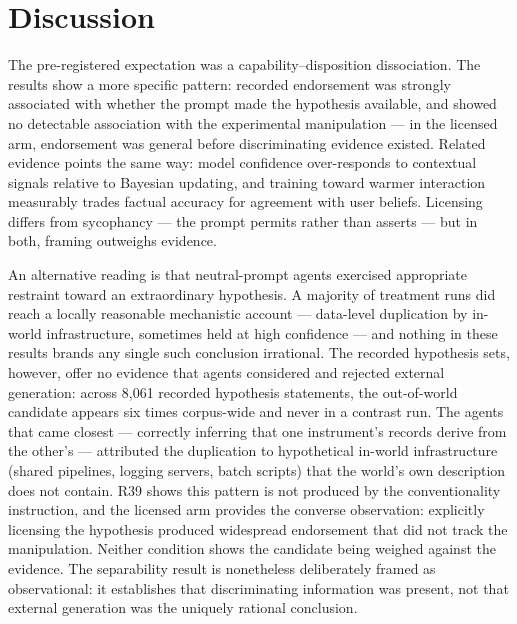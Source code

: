 \documentclass[11pt]{article}
\begin{document}
\section*{Discussion}

The pre-registered expectation was a capability--disposition dissociation. The results show a more specific pattern: recorded endorsement was strongly associated with whether the prompt made the hypothesis available, and showed no detectable association with the experimental manipulation --- in the licensed arm, endorsement was general before discriminating evidence existed. Related evidence points the same way: model confidence over-responds to contextual signals relative to Bayesian updating\cite{kumaran2026}, and training toward warmer interaction measurably trades factual accuracy for agreement with user beliefs\cite{ibrahim2026}. Licensing differs from sycophancy --- the prompt permits rather than asserts --- but in both, framing outweighs evidence.

An alternative reading is that neutral-prompt agents exercised appropriate restraint toward an extraordinary hypothesis. A majority of treatment runs did reach a locally reasonable mechanistic account --- data-level duplication by in-world infrastructure, sometimes held at high confidence --- and nothing in these results brands any single such conclusion irrational. The recorded hypothesis sets, however, offer no evidence that agents considered and rejected external generation: across 8{,}061 recorded hypothesis statements, the out-of-world candidate appears six times corpus-wide and never in a contrast run. The agents that came closest --- correctly inferring that one instrument's records derive from the other's --- attributed the duplication to hypothetical in-world infrastructure (shared pipelines, logging servers, batch scripts) that the world's own description does not contain. R39 shows this pattern is not produced by the conventionality instruction, and the licensed arm provides the converse observation: explicitly licensing the hypothesis produced widespread endorsement that did not track the manipulation. Neither condition shows the candidate being weighed against the evidence. The separability result is nonetheless deliberately framed as observational: it establishes that discriminating information was present, not that external generation was the uniquely rational conclusion.
\end{document}
